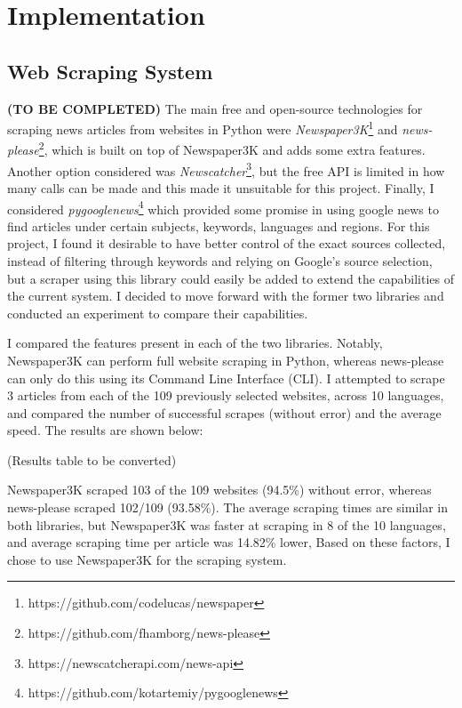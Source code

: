 \documentclass{l4proj}
\begin{document}
\chapter{Implementation}
\section{Web Scraping System}
\textbf{(TO BE COMPLETED)}
The main free and open-source technologies for scraping news articles from websites in Python were \emph{Newspaper3K}\footnote{https://github.com/codelucas/newspaper} and \emph{news-please}\footnote{https://github.com/fhamborg/news-please}, which is built on top of Newspaper3K and adds some extra features. Another option considered was \emph{Newscatcher}\footnote{https://newscatcherapi.com/news-api}, but the free API is limited in how many calls can be made and this made it unsuitable for this project. Finally, I considered \emph{pygooglenews}\footnote{https://github.com/kotartemiy/pygooglenews} which provided some promise in using google news to find articles under certain subjects, keywords, languages and regions. For this project, I found it desirable to have better control of the exact sources collected, instead of filtering through keywords and relying on Google's source selection, but a scraper using this library could easily be added to extend the capabilities of the current system. I decided to move forward with the former two libraries and conducted an experiment to compare their capabilities. \par

I compared the features present in each of the two libraries. Notably, Newspaper3K can perform full website scraping in Python, whereas news-please can only do this using its Command Line Interface (CLI). I attempted to scrape 3 articles from each of the 109 previously selected websites, across 10 languages, and compared the number of successful scrapes (without error) and the average speed. The results are shown below: \par 
(Results table to be converted) \par
Newspaper3K scraped 103 of the 109 websites (94.5\%) without error, whereas news-please scraped 102/109 (93.58\%). The average scraping times are similar in both libraries, but Newspaper3K was faster at scraping in 8 of the 10 languages, and average scraping time per article was 14.82\% lower, Based on these factors, I chose to use Newspaper3K for the scraping system.
\end{document}
